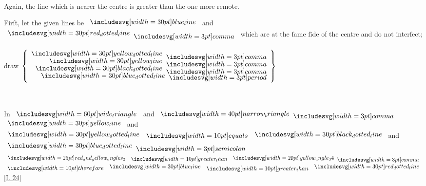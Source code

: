 \documentclass[12pt,preview]{standalone}
\begin{document}
\begin{minipage}[t]{0.64\textwidth}
    \hfill

    \begin{center}
        Again, the line which is nearer the centre is greater than the one more remote.
    \end{center}

    \hfill

    \begin{center}
        Firſt, let the given lines be $\blueline$ and $\dottedredline \bcomma$ which are at the ſame ſide of the centre and do not interſect;\\
        \hfill\\
        draw $\left\{\begin{aligned}\dottedyellowline \bcomma \\[-2ex] \yellowline \bcomma \\[-2ex] \dottedblackline \bcomma \\[-2ex] \dottedblueline \bperiod \end{aligned}\right\}$\\
        \hfill\\
        \hfill\\
    \end{center}

\end{minipage}%

\hfill

\hfill

\pagebreak

\begin{minipage}[t]{0.64\textwidth}
    \vspace{0pt}

    \begin{center}
        In $\img[0][0][60]{wide_triangle}$ and $\img[0][0][40]{narrow_triangle} \bcomma$\\
        $\yellowline$ and $\dottedyellowline \bequals \dottedblackline$ and $\dottedblueline \bsemicolon$\\
        $\img{red_and_yellow_angles_2} \bgt \img[0][0][20]{yellow_angle_34} \bcomma$\\
        $\btherefore \blueline \bgt \dottedredline$ [\hyperref[book1pr24]{\textsc{I.} 24}]
    \end{center}
\end{minipage}

\hfill
\end{document}
